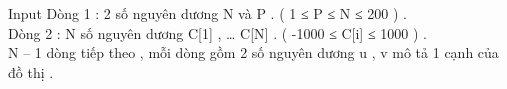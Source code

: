 Input
Dòng 1 : 2 số nguyên dương N và P . ( 1 ≤ P ≤ N ≤ 200 ) .   
\\   Dòng 2 : N số nguyên dương C[1] , … C[N] . ( -1000 ≤ C[i] ≤ 1000 ) .   
\\   N – 1 dòng tiếp theo , mỗi dòng gồm 2 số nguyên dương u , v mô tả 1 cạnh của đồ thị .   
\\